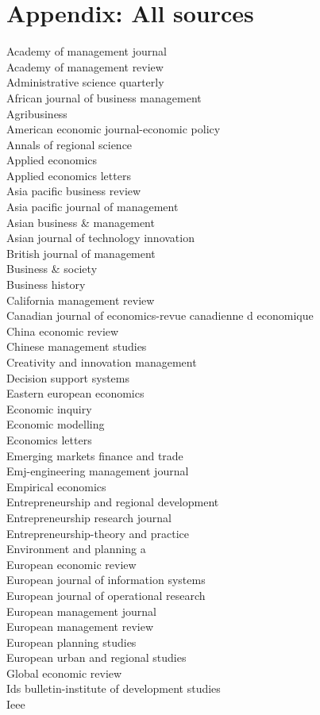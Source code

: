 \documentclass[a4paper]{article}
\begin{document}
\section{Appendix: All sources}
\begin{footnotesize}
Academy of management journal \\ Academy of management review \\ Administrative science quarterly \\ African journal of business management \\ Agribusiness \\ American economic journal-economic policy \\ Annals of regional science \\ Applied economics \\ Applied economics letters \\ Asia pacific business review \\ Asia pacific journal of management \\ Asian business \& management \\ Asian journal of technology innovation \\ British journal of management \\ Business \& society \\ Business history \\ California management review \\ Canadian journal of economics-revue canadienne d economique \\ China economic review \\ Chinese management studies \\ Creativity and innovation management \\ Decision support systems \\ Eastern european economics \\ Economic inquiry \\ Economic modelling \\ Economics letters \\ Emerging markets finance and trade \\ Emj-engineering management journal \\ Empirical economics \\ Entrepreneurship and regional development \\ Entrepreneurship research journal \\ Entrepreneurship-theory and practice \\ Environment and planning a \\ European economic review \\ European journal of information systems \\ European journal of operational research \\ European management journal \\ European management review \\ European planning studies \\ European urban and regional studies \\ Global economic review \\ Ids bulletin-institute of development studies \\ Ieee 
\end{footnotesize}
\end{document}
